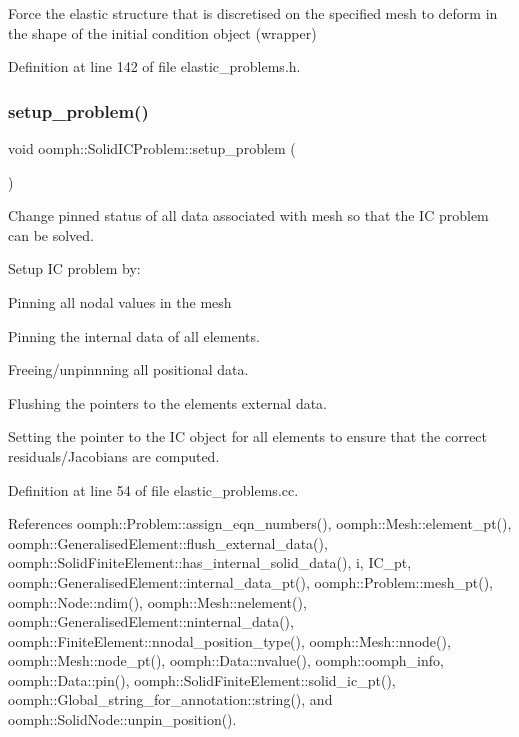Force the elastic structure that is discretised on the specified mesh to deform in the shape of the initial condition object (wrapper) 



Definition at line 142 of file elastic\+\_\+problems.\+h.

\mbox{\label{classoomph_1_1SolidICProblem_a4bbb8c404d1f4ea3827a2c64ae9e06de}} 
\subsubsection{\texorpdfstring{setup\+\_\+problem()}{setup\_problem()}}
{\footnotesize\ttfamily void oomph\+::\+Solid\+I\+C\+Problem\+::setup\+\_\+problem (\begin{DoxyParamCaption}{ }\end{DoxyParamCaption})\hspace{0.3cm}{\ttfamily [private]}}

Change pinned status of all data associated with mesh so that the IC problem can be solved.

Setup IC problem by\+:
\begin{DoxyItemize}
\item Pinning all nodal values in the mesh
\item Pinning the internal data of all elements.
\item Freeing/unpinnning all positional data.
\item Flushing the pointers to the elements\textquotesingle{} external data.
\item Setting the pointer to the IC object for all elements to ensure that the correct residuals/\+Jacobians are computed. 
\end{DoxyItemize}

Definition at line 54 of file elastic\+\_\+problems.\+cc.



References oomph\+::\+Problem\+::assign\+\_\+eqn\+\_\+numbers(), oomph\+::\+Mesh\+::element\+\_\+pt(), oomph\+::\+Generalised\+Element\+::flush\+\_\+external\+\_\+data(), oomph\+::\+Solid\+Finite\+Element\+::has\+\_\+internal\+\_\+solid\+\_\+data(), i, I\+C\+\_\+pt, oomph\+::\+Generalised\+Element\+::internal\+\_\+data\+\_\+pt(), oomph\+::\+Problem\+::mesh\+\_\+pt(), oomph\+::\+Node\+::ndim(), oomph\+::\+Mesh\+::nelement(), oomph\+::\+Generalised\+Element\+::ninternal\+\_\+data(), oomph\+::\+Finite\+Element\+::nnodal\+\_\+position\+\_\+type(), oomph\+::\+Mesh\+::nnode(), oomph\+::\+Mesh\+::node\+\_\+pt(), oomph\+::\+Data\+::nvalue(), oomph\+::oomph\+\_\+info, oomph\+::\+Data\+::pin(), oomph\+::\+Solid\+Finite\+Element\+::solid\+\_\+ic\+\_\+pt(), oomph\+::\+Global\+\_\+string\+\_\+for\+\_\+annotation\+::string(), and oomph\+::\+Solid\+Node\+::unpin\+\_\+position().




